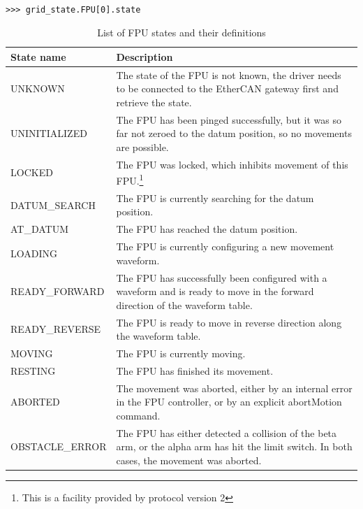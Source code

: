 \documentclass[11pt,a4paper]{scrartcl}
\begin{document}
\begin{verbatim}

>>> grid_state.FPU[0].state
\end{verbatim}


\begin{table}
    \begin{minipage}{0.8\textwidth}
  \begin{centering}
\begin{tabular}{|l|p{}|}
  \hline
  \textbf{State name} & \textbf{Description} \\
  \hline 
UNKNOWN & The state of the FPU is not known, the driver needs to
be connected to the EtherCAN gateway first and retrieve the state.\\
\hline
UNINITIALIZED & The FPU has been pinged successfully, but it was
  so far not zeroed to the datum position, so no movements are
  possible.\\
\hline
LOCKED & The FPU was locked, which inhibits movement of this
  FPU.\footnote{This is a facility provided by protocol version 2}\\
\hline
DATUM\_SEARCH & The FPU is currently searching for the datum
position.\\
\hline
AT\_DATUM      & The FPU has reached the datum position.\\
\hline
LOADING & The FPU is currently configuring a new movement waveform.\\
\hline
READY\_FORWARD & The FPU has successfully been configured with a waveform
and is ready to move in the forward
  direction of the waveform table.\\
\hline
READY\_REVERSE& The FPU is ready to move in reverse direction along the
  waveform table.\\
\hline
MOVING        & The FPU is currently moving.\\
\hline
RESTING       & The FPU has finished its movement.\\
\hline
ABORTED & The movement was aborted, either by an internal error
  in the FPU controller, or by an explicit abortMotion command.\\
\hline
OBSTACLE\_ERROR& The FPU has either detected a collision of the
  beta arm, or the alpha arm has hit the limit switch. In both cases, the
  movement was aborted. \\
\hline
\end{tabular}
\end{centering}
\end{minipage}
\caption{List of FPU states and their definitions}
\label{tab:fpustates}
\end{table}
\end{document}
